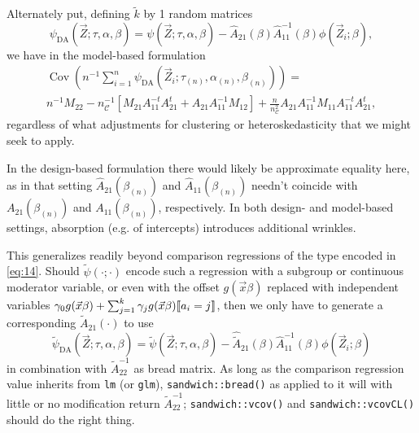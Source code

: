 \documentclass{article}
\DeclarePairedDelimiter{\indicator}{\llbracket}{\rrbracket}
\begin{document}
Alternately put,
defining $\tilde{k}$ by 1 random matrices 
\begin{equation}\label{eq:10}
    \psi_\text{DA}(\vec{Z}; \tau, \alpha, 
    \beta) = \psi (\vec{Z}; \tau,\alpha, 
    \beta) -
    \hat{A}_{21}(\beta) \hat{A}_{11}^{-1}(\beta)\phi(\vec{Z}_{i};
    \beta), 
\end{equation}
we have in the model-based formulation 
\begin{multline*}
  \operatorname{Cov}\left(n^{-1}\sum_{i=1}^{n} \psi_\text{DA}(\vec{Z}_{i}; \tau_{(n)},\alpha_{(n)},
    \beta_{(n)})\right) = \\
  n^{-1}M_{22} -
                                 n_{\mathcal{C}}^{-1}[M_{21}A_{11}^{-t}A_{21}^t
                                 + A_{21}A_{11}^{-1}M_{12}] +
                                 \frac{n}{n_{\mathcal{C}}^{2}}A_{21}A_{11}^{-1}M_{11}A_{11}^{-t}A_{21}^{t},
                               \end{multline*}
regardless of what adjustments for
clustering or heteroskedasticity that we might seek to apply.


In the design-based formulation there
would likely be approximate equality here, as in that setting
$\hat{A}_{21}(\beta_{(n)})$ and $\hat{A}_{11}(\beta_{(n)})$ needn't
coincide with ${A}_{21}(\beta_{(n)})$ and ${A}_{11}(\beta_{(n)})$, respectively.  In both design- and model-based settings, absorption (e.g. of intercepts) introduces additional wrinkles.

This generalizes readily beyond comparison regressions of the type encoded in \eqref{eq:14}. Should $\tilde{\psi}(\cdot; \cdot)$ encode such a regression with a subgroup or continuous moderator variable, or even with the offset $g(\vec{x}\beta)$ replaced with independent variables $\gamma_{0}g(\vec{x}\beta) + \sum_{j=1}^{k}\gamma_{j} g(\vec{x}\beta)\indicator{a_{i}=j}$, then we only have to generate a corresponding $\tilde{A}_{21}(\cdot)$ to use
\begin{equation*}
      \tilde{\psi}_\text{DA}(\vec{Z}; \tau, \alpha, 
    \beta) = \tilde{\psi} (\vec{Z}; \tau,\alpha, 
    \beta) -
    \hat{\tilde{A}}_{21}(\beta) \hat{A}_{11}^{-1}(\beta)\phi(\vec{Z}_{i};
    \beta)
\end{equation*}
in combination with $\tilde{A}_{22}^{-1}$ as bread matrix. As long as the comparison regression value inherits from \texttt{lm} (or \texttt{glm}), \texttt{sandwich::bread()} as applied to it will with little or no modification return
$\tilde{A}_{22}^{-1}$; \texttt{sandwich::vcov()} and \texttt{sandwich::vcovCL()} should do the right thing. 
\end{document}
